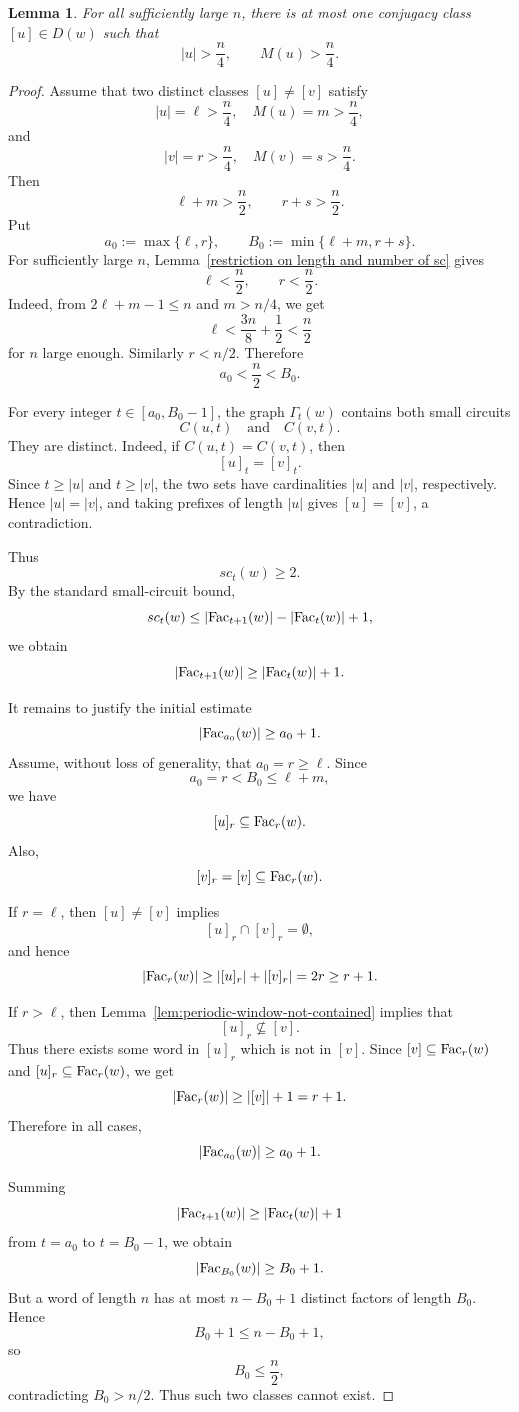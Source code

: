 \documentclass[runningheads,envcountsame,a4paper]{llncs}
\newtheorem{lem}[thm]{Lemma}
\newcommand{\fac}{\hbox{\rm Fac}}
\begin{document}
\begin{lem}\label{lem:large-large-unique}
For all sufficiently large \(n\), there is at most one conjugacy class
\([u]\in D(w)\) such that
\[
        |u|>\frac n4,
        \qquad
        M(u)>\frac n4 .
\]
\end{lem}

\begin{proof}
Assume that two distinct classes \([u]\neq[v]\) satisfy
\[
        |u|=\ell>\frac n4,\quad M(u)=m>\frac n4,
\]
and
\[
        |v|=r>\frac n4,\quad M(v)=s>\frac n4.
\]
Then
\[
        \ell+m>\frac n2,
        \qquad
        r+s>\frac n2.
\]
Put
\[
        a_0:=\max\{\ell,r\},
        \qquad
        B_0:=\min\{\ell+m,r+s\}.
\]
For sufficiently large \(n\), Lemma~\ref{restriction on length and number of sc} gives
\[
        \ell<\frac n2,
        \qquad
        r<\frac n2.
\]
Indeed, from \(2\ell+m-1\le n\) and \(m>n/4\), we get
\[
        \ell<\frac{3n}{8}+\frac12<\frac n2
\]
for \(n\) large enough. Similarly \(r<n/2\). Therefore
\[
        a_0<\frac n2<B_0.
\]

For every integer \(t\in[a_0,B_0-1]\), the graph \(\Gamma_t(w)\) contains both
small circuits
\[
        C(u,t)
        \quad\text{and}\quad
        C(v,t).
\]
They are distinct. Indeed, if \(C(u,t)=C(v,t)\), then
\[
        [u]_t=[v]_t.
\]
Since \(t\ge |u|\) and \(t\ge |v|\), the two sets have cardinalities \(|u|\) and
\(|v|\), respectively. Hence \(|u|=|v|\), and taking prefixes of length \(|u|\)
gives \([u]=[v]\), a contradiction.

Thus
\[
        sc_t(w)\ge 2.
\]
By the standard small-circuit bound,
\[
        sc_t(w)\le |\fac_{t+1}(w)|-|\fac_t(w)|+1,
\]
we obtain
\[
        |\fac_{t+1}(w)|\ge |\fac_t(w)|+1.
\]

It remains to justify the initial estimate
\[
        |\fac_{a_0}(w)|\ge a_0+1.
\]
Assume, without loss of generality, that \(a_0=r\ge \ell\). Since
\[
        a_0=r<B_0\le \ell+m,
\]
we have
\[
        [u]_r\subseteq \fac_r(w).
\]
Also,
\[
        [v]_r=[v]\subseteq \fac_r(w).
\]

If \(r=\ell\), then \([u]\neq[v]\) implies
\[
        [u]_r\cap [v]_r=\emptyset,
\]
and hence
\[
        |\fac_r(w)|\ge |[u]_r|+|[v]_r|=2r\ge r+1.
\]

If \(r>\ell\), then Lemma~\ref{lem:periodic-window-not-contained} implies
that
\[
        [u]_r\nsubseteq [v].
\]
Thus there exists some word in \([u]_r\) which is not in \([v]\). Since
\([v]\subseteq \fac_r(w)\) and \([u]_r\subseteq \fac_r(w)\), we get
\[
        |\fac_r(w)|\ge |[v]|+1=r+1.
\]
Therefore in all cases,
\[
        |\fac_{a_0}(w)|\ge a_0+1.
\]

Summing
\[
        |\fac_{t+1}(w)|\ge |\fac_t(w)|+1
\]
from \(t=a_0\) to \(t=B_0-1\), we obtain
\[
        |\fac_{B_0}(w)|\ge B_0+1.
\]
But a word of length \(n\) has at most \(n-B_0+1\) distinct factors of length
\(B_0\). Hence
\[
        B_0+1\le n-B_0+1,
\]
so
\[
        B_0\le \frac n2,
\]
contradicting \(B_0>n/2\). Thus such two classes cannot exist.
\end{proof}
\end{document}
